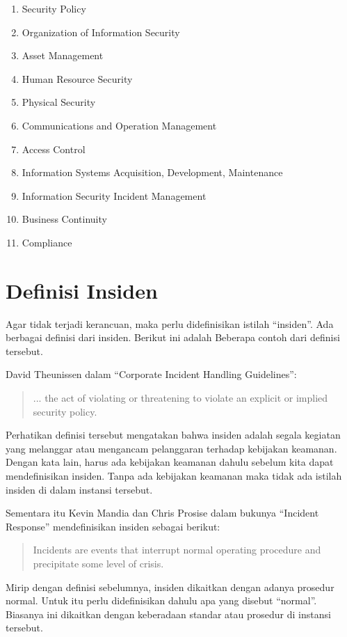 \begin{enumerate}
\item Security Policy
\item Organization of Information Security
\item Asset Management
\item Human Resource Security
\item Physical Security
\item Communications and Operation Management
\item Access Control
\item Information Systems Acquisition, Development, Maintenance
\item Information Security Incident Management
\item Business Continuity
\item Compliance
\end{enumerate}

\section{Definisi Insiden}
Agar tidak terjadi kerancuan, maka perlu didefinisikan istilah ``insiden''.
Ada berbagai definisi dari insiden. Berikut ini adalah Beberapa
contoh dari definisi tersebut.

David Theunissen dalam ``Corporate Incident Handling Guidelines'':
\begin{quote}
... the act of violating or threatening to violate an explicit or 
implied security policy.
\end{quote}
Perhatikan definisi tersebut mengatakan bahwa insiden adalah segala
kegiatan yang melanggar atau mengancam pelanggaran terhadap
kebijakan keamanan. Dengan kata lain, harus ada kebijakan keamanan
dahulu sebelum kita dapat mendefinisikan insiden.
Tanpa ada kebijakan keamanan maka tidak ada istilah insiden di
dalam instansi tersebut.


Sementara itu Kevin Mandia dan Chris Prosise dalam bukunya
``Incident Response'' mendefinisikan insiden sebagai berikut:
\begin{quote}
   Incidents are events that interrupt normal operating procedure
   and precipitate some level of crisis.
\end{quote}
Mirip dengan definisi sebelumnya, insiden dikaitkan dengan adanya
prosedur normal. Untuk itu perlu didefinisikan dahulu apa yang
disebut ``normal''. Biasanya ini dikaitkan dengan keberadaan
standar atau prosedur di instansi tersebut.


